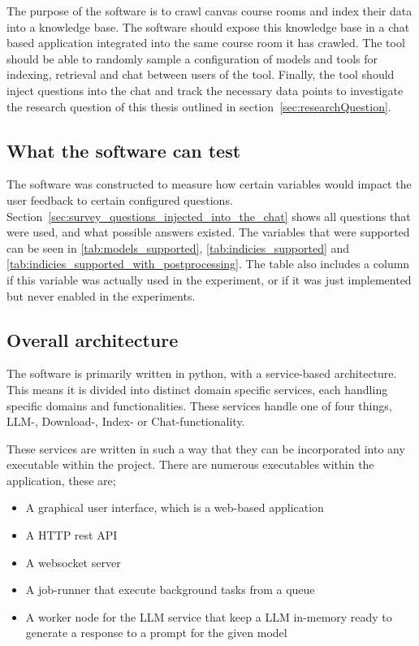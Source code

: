 The purpose of the software is to crawl canvas course rooms and index their data into a knowledge base. The software should expose this knowledge base in a chat based application integrated into the same course room it has crawled. The tool should be able to randomly sample a configuration of models and tools for indexing, retrieval and chat between users of the tool. Finally, the tool should inject questions into the chat and track the necessary data points to investigate the research question of this thesis outlined in section~\ref{sec:researchQuestion}.


\subsection{What the software can test}


The software was constructed to measure how certain variables would impact the user feedback to certain configured questions. Section~\ref{sec:survey_questions_injected_into_the_chat} shows all questions that were used, and what possible answers existed. The variables that were supported can be seen in \autoref{tab:models_supported}, \autoref{tab:indicies_supported} and \autoref{tab:indicies_supported_with_postprocessing}. The table also includes a column if this variable was actually used in the experiment, or if it was just implemented but never enabled in the experiments.





\subsection{Overall architecture}


The software is primarily written in python, with a service-based architecture. This means it is divided into distinct domain specific services, each handling specific domains and functionalities. These services handle one of four things, \gls{LLM}-, Download-, Index- or Chat-functionality.


These services are written in such a way that they can be incorporated into any executable within the project. There are numerous executables within the application, these are;


\begin{itemize}
        \item A graphical user interface, which is a web-based application
        \item A HTTP rest API
        \item A websocket server
        \item A job-runner that execute background tasks from a queue
        \item A worker node for the \gls{LLM} service that keep a \gls{LLM} in-memory ready to generate a response to a prompt for the given model
\end{itemize}


